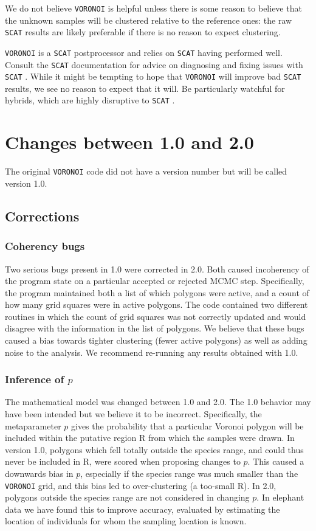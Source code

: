 \documentclass[10pt,titlepage,times,letterpaper]{article}
\def\SCAT{{\tt SCAT} }
\def\VORONOI{{\tt VORONOI} }
\begin{document}
We do not believe \VORONOI is helpful unless there is some reason to believe that the
unknown samples will be clustered relative to the reference ones:  the raw \SCAT results
are likely preferable if there is no reason to expect clustering.

\VORONOI is a \SCAT postprocessor and relies on \SCAT having performed well.
Consult the \SCAT documentation for advice on diagnosing and fixing issues with \SCAT.
While it might be tempting to hope that \VORONOI will improve bad \SCAT results, we
see no reason to expect that it will.  Be particularly watchful for hybrids, which are
highly disruptive to \SCAT.

\section{Changes between 1.0 and 2.0} \label{changes}

The original \VORONOI code did not have a version number but will be called version 1.0.

\subsection{Corrections}

\subsubsection{Coherency bugs}  
Two serious bugs present in 1.0 were corrected in 2.0.  Both 
caused incoherency of the program state on a particular accepted or rejected MCMC
step.  Specifically, the program maintained both a list of which polygons were
active, and a count of how many grid squares were in active polygons.
The code contained two different routines in which the count of grid squares was not 
correctly updated and would
disagree with the information in the list of polygons.  We believe that these bugs 
caused a bias towards tighter clustering (fewer active polygons) as well as
adding noise to the analysis.  We recommend re-running any results obtained with 1.0.

\subsubsection{ Inference of $p$} 
The mathematical model was changed between 1.0 and 2.0.   
The 1.0 behavior may have been
intended but we believe it to be incorrect.   Specifically, the metaparameter
$p$ gives the probability that a particular Voronoi polygon will be included within
the putative region R from which the samples were drawn.  In version 1.0, polygons which
fell totally outside the species range, and could thus never be included in R,
were scored when proposing changes to $p$.  This caused a downwards bias in $p$,
especially if the species range was much smaller than the \VORONOI grid, and this bias
led to over-clustering (a too-small R).  In 2.0, polygons outside the species range
are not considered in changing $p$.  In elephant data we have found this to improve
accuracy, evaluated by estimating the location of individuals for whom the sampling
location is known. 
\end{document}
